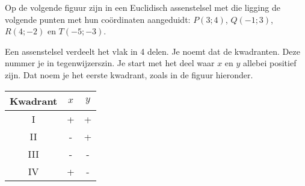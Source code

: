 
Op de volgende figuur zijn in een Euclidisch assenstelsel met die ligging de volgende punten met hun co\"ordinaten aangeduidt: $P(3;4)$, $Q(-1;3)$, $R(4;-2)$ en $T(-5;-3)$.




Een assenstelsel verdeelt het vlak in 4 delen.
Je noemt dat de kwadranten.
Deze nummer je in tegenwijzerszin. 
Je start met het deel waar $x$ en $y$ allebei positief zijn.
Dat noem je het eerste kwadrant, zoals in de figuur hieronder.

\begin{minipage}{.5\linewidth}
\begin{center}
\begin{tabular}{c|c|c}
	Kwadrant & $x$ & $y$ \\
	\hline
	I & + & + \\
	II & - & + \\
	III & - & - \\
	IV & + & - \\
\end{tabular}	
\end{center}
\end{minipage}
\begin{minipage}{.5\linewidth}
\begin{center}
		
\end{center}
\end{minipage}
